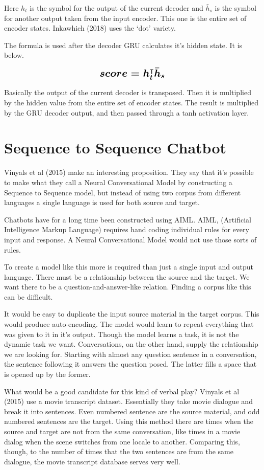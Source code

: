 Here $h_t$ is the symbol for the output of the current decoder and $\bar{h}_s $ is the symbol for another output taken from the input encoder. This one is the entire set of encoder states. Inkawhich (2018)\cite{2018Inkawhich} uses the `dot' variety.

The formula is used after the decoder GRU calculates it's hidden state. It is below.

$$ 
\boldmath
\mathlarger{ \mathlarger{
score = h_t^\intercal \bar{h}_s 
} }
\unboldmath
$$ 

Basically the output of the current decoder is transposed. Then it is multiplied by the hidden value from the entire set of encoder states. The result is multiplied by the GRU decoder output, and then passed through a tanh activation layer.

\section{Sequence to Sequence Chatbot}

Vinyals et al (2015)\cite{DBLP:journals/corr/VinyalsL15} make an interesting proposition. They say that it's possible to make what they call a Neural Conversational Model by constructing a Sequence to Sequence model, but instead of using two corpus from different languages a single language is used for both source and target.

Chatbots have for a long time been constructed using \ac{AIML}. AIML, (Artificial Intelligence Markup Language) requires hand coding individual rules for every input and response. A Neural Conversational Model would not use those sorts of rules.

To create a model like this more is required than just a single input and output language. There must be a relationship between the source and the target. We want there to be a question-and-answer-like relation. Finding a corpus like this can be difficult.

It would be easy to duplicate the input source material in the target corpus. This would produce auto-encoding. The model would learn to repeat everything that was given to it in it's output. Though the model learns a task, it is not the dynamic task we want. Conversations, on the other hand, supply the relationship we are looking for. Starting with almost any question sentence in a conversation, the sentence following it answers the question posed. The latter fills a space that is opened up by the former. 

What would be a good candidate for this kind of verbal play? Vinyals et al (2015)\cite{DBLP:journals/corr/VinyalsL15} use a movie transcript dataset. Essentially they take movie dialogue and break it into sentences. Even numbered sentence are the source material, and odd numbered sentences are the target. Using this method there are times when the source and target are not from the same conversation, like times in a movie dialog when the scene switches from one locale to another. Comparing this, though, to the number of times that the two sentences are from the same dialogue, the movie transcript database serves very well.

